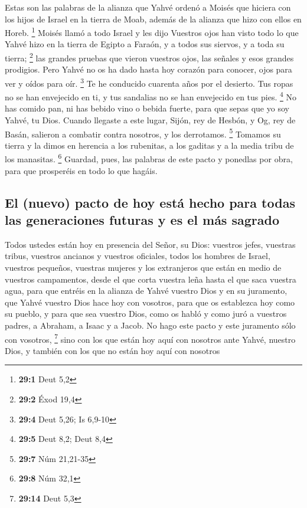 \begin{paracol}{2}
 Estas son las palabras de la alianza que Yahvé ordenó a
Moisés que hiciera con los hijos de Israel en la tierra de Moab, además
de la alianza que hizo con ellos en Horeb. \footnote{\textbf{29:1} Deut
  5,2}  Moisés llamó a todo Israel y les dijo Vuestros
ojos han visto todo lo que Yahvé hizo en la tierra de Egipto a Faraón, y
a todos sus siervos, y a toda su tierra; \footnote{\textbf{29:2} Éxod
  19,4}  las grandes pruebas que vieron vuestros ojos, las
señales y esos grandes prodigios.  Pero Yahvé no os ha
dado hasta hoy corazón para conocer, ojos para ver y oídos para oír.
\footnote{\textbf{29:4} Deut 5,26; Is 6,9-10}  Te he
conducido cuarenta años por el desierto. Tus ropas no se han envejecido
en ti, y tus sandalias no se han envejecido en tus pies. \footnote{\textbf{29:5}
  Deut 8,2; Deut 8,4}  No has comido pan, ni has bebido
vino o bebida fuerte, para que sepas que yo soy Yahvé, tu Dios.
 Cuando llegaste a este lugar, Sijón, rey de Hesbón, y Og,
rey de Basán, salieron a combatir contra nosotros, y los derrotamos.
\footnote{\textbf{29:7} Núm 21,21-35}  Tomamos su tierra y
la dimos en herencia a los rubenitas, a los gaditas y a la media tribu
de los manasitas. \footnote{\textbf{29:8} Núm 32,1} 
Guardad, pues, las palabras de este pacto y ponedlas por obra, para que
prosperéis en todo lo que hagáis.

\hypertarget{el-nuevo-pacto-de-hoy-estuxe1-hecho-para-todas-las-generaciones-futuras-y-es-el-muxe1s-sagrado}{%
\subsection{El (nuevo) pacto de hoy está hecho para todas las
generaciones futuras y es el más
sagrado}\label{el-nuevo-pacto-de-hoy-estuxe1-hecho-para-todas-las-generaciones-futuras-y-es-el-muxe1s-sagrado}}

 Todos ustedes están hoy en presencia del Señor, su Dios:
vuestros jefes, vuestras tribus, vuestros ancianos y vuestros oficiales,
todos los hombres de Israel,  vuestros pequeños, vuestras
mujeres y los extranjeros que están en medio de vuestros campamentos,
desde el que corta vuestra leña hasta el que saca vuestra agua,
 para que entréis en la alianza de Yahvé vuestro Dios y
en su juramento, que Yahvé vuestro Dios hace hoy con vosotros,
 para que os establezca hoy como su pueblo, y para que
sea vuestro Dios, como os habló y como juró a vuestros padres, a
Abraham, a Isaac y a Jacob.  No hago este pacto y este
juramento sólo con vosotros, \footnote{\textbf{29:14} Deut 5,3}
 sino con los que están hoy aquí con nosotros ante Yahvé,
nuestro Dios, y también con los que no están hoy aquí con nosotros


\end{paracol}
